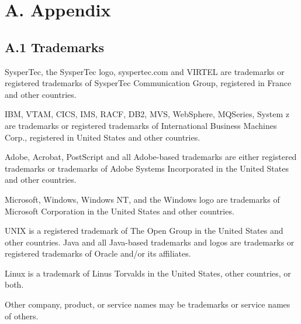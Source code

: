 \documentclass[letterpaper,10pt,english]{sphinxmanual}
\begin{document}
\chapter{A. Appendix}
\label{\detokenize{connectivity_guide:a-appendix}}

\section{A.1 Trademarks}
\label{\detokenize{connectivity_guide:a-1-trademarks}}
SysperTec, the SysperTec logo, syspertec.com and VIRTEL are trademarks or registered trademarks of SysperTec
Communication Group, registered in France and other countries.

IBM, VTAM, CICS, IMS, RACF, DB2, MVS, WebSphere, MQSeries, System z are trademarks or registered trademarks of
International Business Machines Corp., registered in United States and other countries.

Adobe, Acrobat, PostScript and all Adobe-based trademarks are either registered trademarks or trademarks of Adobe
Systems Incorporated in the United States and other countries.

Microsoft, Windows, Windows NT, and the Windows logo are trademarks of Microsoft Corporation in the United States
and other countries.

UNIX is a registered trademark of The Open Group in the United States and other countries.
Java and all Java-based trademarks and logos are trademarks or registered trademarks of Oracle and/or its affiliates.

Linux is a trademark of Linus Torvalds in the United States, other countries, or both.

Other company, product, or service names may be trademarks or service names of others.
\end{document}
